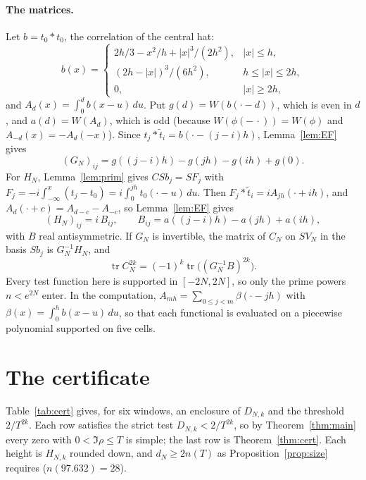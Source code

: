 \documentclass[11pt,a4paper]{article}
\theoremstyle{plain}
\theoremstyle{remark}
\DeclareMathOperator{\tr}{tr}
\begin{document}
\paragraph{The matrices.}
Let $b=t_0*t_0$, the correlation of the central hat:
\[
 b(x)=\begin{cases}2h/3-x^2/h+|x|^3/(2h^2),&|x|\le h,\\ (2h-|x|)^3/(6h^2),&h\le|x|\le2h,\\ 0,&|x|\ge2h,\end{cases}
\]
and $A_d(x)=\int_0^db(x-u)\,du$. Put $g(d)=W(b(\cdot-d))$, which is even in $d$, and $a(d)=W(A_d)$, which is odd
(because $W(\phi(-\,\cdot))=W(\phi)$ and $A_{-d}(x)=-A_d(-x)$). Since $t_j*\widetilde t_i=b(\cdot-(j-i)h)$,
Lemma~\ref{lem:EF} gives
\[
 (G_N)_{ij}=g((j-i)h)-g(jh)-g(ih)+g(0).
\]
For $H_N$, Lemma~\ref{lem:prim} gives $CSb_j=SF_j$ with $F_j=-i\int_{-\infty}^x(t_j-t_0)=i\int_0^{jh}t_0(\cdot-u)\,du$.
Then $F_j*\widetilde t_i=iA_{jh}(\cdot+ih)$, and $A_d(\cdot+c)=A_{d-c}-A_{-c}$, so Lemma~\ref{lem:EF} gives
\[
 (H_N)_{ij}=i\,B_{ij},\qquad B_{ij}=a((j-i)h)-a(jh)+a(ih),
\]
with $B$ real antisymmetric. If $G_N$ is invertible, the matrix of $C_N$ on $SV_N$ in the basis $Sb_j$ is
$G_N^{-1}H_N$, and
\[
 \tr C_N^{2k}=(-1)^k\tr\bigl((G_N^{-1}B)^{2k}\bigr).
\]
Every test function here is supported in $[-2N,2N]$, so only the prime powers $n<e^{2N}$ enter. In the computation,
$A_{mh}=\sum_{0\le j<m}\beta(\cdot-jh)$ with $\beta(x)=\int_0^hb(x-u)\,du$, so that each functional is evaluated on
a piecewise polynomial supported on five cells.

\section{The certificate}\label{sec:cert}

Table~\ref{tab:cert} gives, for six windows, an enclosure of $D_{N,k}$ and the threshold $2/T^{2k}$. Each row
satisfies the strict test $D_{N,k}<2/T^{2k}$, so by Theorem~\ref{thm:main} every zero with $0<\Im\rho\le T$ is simple;
the last row is Theorem~\ref{thm:cert}. Each height is $H_{N,k}$ rounded down, and $d_N\ge2n(T)$ as
Proposition~\ref{prop:size} requires ($n(97.632)=28$).
\end{document}
